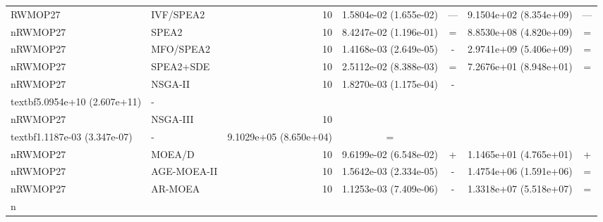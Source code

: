 \begin{table}[t]
{\begin{tabular}{llrcccc}
RWMOP27 & IVF/SPEA2 & 10 & 1.5804e-02 (1.655e-02) & --- & 9.1504e+02 (8.354e+09) & --- \\nRWMOP27 & SPEA2 & 10 & 8.4247e-02 (1.196e-01) & = & 8.8530e+08 (4.820e+09) & = \\nRWMOP27 & MFO/SPEA2 & 10 & 1.4168e-03 (2.649e-05) & - & 2.9741e+09 (5.406e+09) & = \\nRWMOP27 & SPEA2+SDE & 10 & 2.5112e-02 (8.388e-03) & = & 7.2676e+01 (8.948e+01) & = \\nRWMOP27 & NSGA-II & 10 & 1.8270e-03 (1.175e-04) & - & \\textbf{5.0954e+10 (2.607e+11)} & - \\nRWMOP27 & NSGA-III & 10 & \\textbf{1.1187e-03 (3.347e-07)} & - & 9.1029e+05 (8.650e+04) & = \\nRWMOP27 & MOEA/D & 10 & 9.6199e-02 (6.548e-02) & + & 1.1465e+01 (4.765e+01) & + \\nRWMOP27 & AGE-MOEA-II & 10 & 1.5642e-03 (2.334e-05) & - & 1.4754e+06 (1.591e+06) & = \\nRWMOP27 & AR-MOEA & 10 & 1.1253e-03 (7.409e-06) & - & 1.3318e+07 (5.518e+07) & = \\n\botrule
\end{tabular}
}
\end{table}
